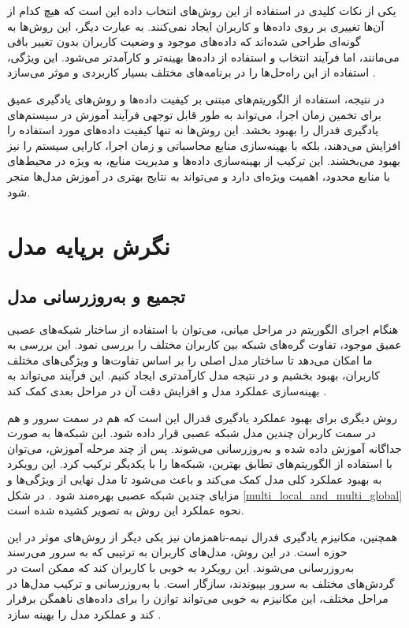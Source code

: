 یکی از نکات کلیدی در استفاده از این روش‌های انتخاب داده این است که هیچ کدام از آن‌ها تغییری بر روی داده‌ها و کاربران ایجاد نمی‌کنند. به عبارت دیگر، این روش‌ها به گونه‌ای طراحی شده‌اند که داده‌های موجود و وضعیت کاربران بدون تغییر باقی می‌مانند، اما فرآیند انتخاب و استفاده از داده‌ها بهینه‌تر و کارآمدتر می‌شود. این ویژگی، استفاده از این راه‌حل‌ها را در برنامه‌های مختلف بسیار کاربردی و موثر می‌سازد
\cite{zeng2022local}.

در نتیجه، استفاده از الگوریتم‌های مبتنی بر کیفیت داده‌ها و روش‌های یادگیری عمیق برای تخمین زمان اجرا، می‌تواند به طور قابل توجهی فرآیند آموزش در سیستم‌های یادگیری فدرال را بهبود بخشد. این روش‌ها نه تنها کیفیت داده‌های مورد استفاده را افزایش می‌دهند، بلکه با بهینه‌سازی منابع محاسباتی و زمان اجرا، کارایی سیستم را نیز بهبود می‌بخشند. این ترکیب از بهینه‌سازی داده‌ها و مدیریت منابع، به ویژه در محیط‌های با منابع محدود، اهمیت ویژه‌ای دارد و می‌تواند به نتایج بهتری در آموزش مدل‌ها منجر شود.


\section{نگرش برپایه مدل}
\subsection{
	تجمیع و به‌روزرسانی مدل%
}	
هنگام اجرای الگوریتم در مراحل میانی، می‌توان با استفاده از ساختار شبکه‌های عصبی عمیق موجود، تفاوت گره‌های شبکه بین کاربران مختلف را بررسی نمود. این بررسی به ما امکان می‌دهد تا ساختار مدل اصلی را بر اساس تفاوت‌ها و ویژگی‌های مختلف کاربران، بهبود بخشیم و در نتیجه مدل کارآمدتری ایجاد کنیم. این فرآیند می‌تواند به بهینه‌سازی عملکرد مدل و افزایش دقت آن در مراحل بعدی کمک کند
\cite{sannara2021federated}.

روش دیگری برای بهبود عملکرد یادگیری فدرال این است که هم در سمت سرور و هم در سمت کاربران چندین مدل شبکه عصبی قرار داده شود. این شبکه‌ها به صورت جداگانه آموزش داده شده و به‌روزرسانی می‌شوند. پس از چند مرحله آموزش، می‌توان با استفاده از الگوریتم‌های تطابق بهترین، شبکه‌ها را با یکدیگر ترکیب کرد. این رویکرد به بهبود عملکرد کلی مدل کمک می‌کند و باعث می‌شود تا مدل نهایی از ویژگی‌ها و مزایای چندین شبکه عصبی بهره‌مند شود
\cite{qin2021mlmg}.
در شکل
\ref{multi_local_and_multi_global}
نحوه عملکرد این روش به تصویر کشیده شده است. 

همچنین، مکانیزم یادگیری فدرال نیمه-ناهمزمان%
نیز یکی دیگر از روش‌های موثر در این حوزه است. در این روش، مدل‌های کاربران به ترتیبی که به سرور می‌رسند به‌روزرسانی می‌شوند. این رویکرد به خوبی با کاربران کند%
که ممکن است در گردش‌های مختلف به سرور بپیوندند، سازگار است. با به‌روزرسانی و ترکیب مدل‌ها در مراحل مختلف، این مکانیزم به خوبی می‌تواند توازن را برای داده‌های ناهمگن برقرار کند و عملکرد مدل را بهینه سازد
\cite{ma2021fedsa, ma2022state}.

